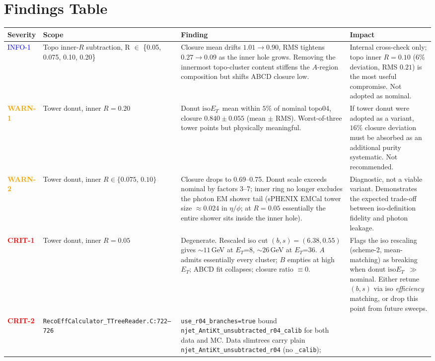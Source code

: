 \documentclass[11pt,a4paper]{article}
\newcommand{\etg}{$E_T$}
\newcommand{\isoET}{$\mathrm{iso}E_T$}
\newcommand{\crit}[1]{\textcolor{red}{\textbf{#1}}}
\newcommand{\warn}[1]{\textcolor{orange}{\textbf{#1}}}
\newcommand{\info}[1]{\textcolor{blue}{#1}}
\begin{document}
\section{Findings Table}

\begin{longtable}{@{}p{1.6cm}p{4.3cm}p{6.1cm}p{4.6cm}@{}}
\toprule
Severity & Scope & Finding & Impact \\
\midrule
\info{INFO-1} & Topo inner-$R$ subtraction, R $\in$ \{0.05,
  0.075, 0.10, 0.20\} &
  Closure mean drifts $1.01 \to 0.90$, RMS tightens
  $0.27 \to 0.09$ as the inner hole grows. Removing the innermost
  topo-cluster content stiffens the $A$-region composition but
  shifts ABCD closure low. &
  Internal cross-check only; topo inner $R\!=\!0.10$
  ($6\%$ deviation, RMS $0.21$) is the most useful compromise. Not
  adopted as nominal. \\
\addlinespace
\warn{WARN-1} & Tower donut, inner $R\!=\!0.20$ &
  Donut \isoET\ mean within $5\%$ of nominal topo04, closure
  $0.840\pm 0.055$ (mean $\pm$ RMS). Worst-of-three tower points but
  physically meaningful. &
  If tower donut were adopted as a variant, $16\%$ closure deviation
  must be absorbed as an additional purity systematic. Not
  recommended. \\
\addlinespace
\warn{WARN-2} & Tower donut, inner $R\in\{0.075,\,0.10\}$ &
  Closure drops to 0.69--0.75. Donut scale exceeds nominal by
  factors 3--7; inner ring no longer excludes the photon EM shower
  tail (sPHENIX EMCal tower size $\approx 0.024$ in $\eta/\phi$;
  at $R\!=\!0.05$ essentially the entire shower sits inside the
  inner hole). &
  Diagnostic, not a viable variant. Demonstrates the expected
  trade-off between iso-definition fidelity and photon leakage. \\
\addlinespace
\crit{CRIT-1} & Tower donut, inner $R=0.05$ &
  Degenerate. Rescaled iso cut $(b,s)\!=\!(6.38,0.55)$ gives
  $\sim\!11$\,GeV at \etg=8, $\sim\!26$\,GeV at \etg=36. $A$ admits
  essentially every cluster; $B$ empties at high \etg; ABCD
  fit collapses; closure ratio $\equiv 0$. &
  Flags the iso rescaling
  (scheme-2, mean-matching) as breaking when donut \isoET\
  $\gg$ nominal. Either retune $(b,s)$ via iso \emph{efficiency}
  matching, or drop this point from future sweeps. \\
\addlinespace
\crit{CRIT-2} & \texttt{RecoEffCalculator\_TTreeReader.C:722--726} &
  \texttt{use\_r04\_branches=true} bound
  \texttt{njet\_AntiKt\_unsubtracted\_r04\_calib} for both data and
  MC. Data slimtrees carry plain
  \texttt{njet\_AntiKt\_unsubtracted\_r04} (no \texttt{\_calib});

\end{longtable}
\end{document}
